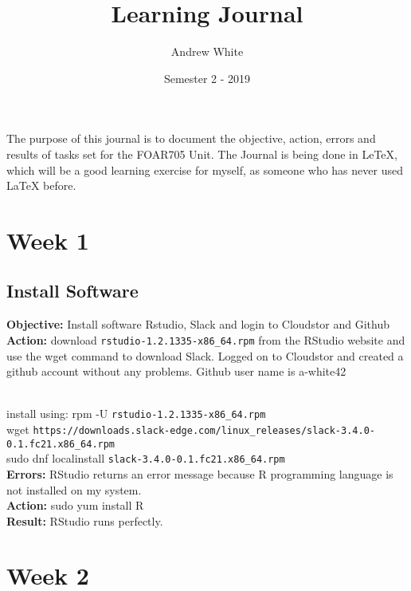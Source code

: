 \documentclass[a4paper,12pt]{article}
\title{Learning Journal}
\author{Andrew White}
\date{Semester 2 - 2019}
\begin{document}
\maketitle

\tableofcontents

\newpage

The purpose of this journal is to document the objective, action, errors and results of tasks set for the FOAR705 Unit. The Journal is being done in LeTeX, which will be a good learning exercise for myself, as someone who has never used LaTeX before. 

\section{Week 1}
\subsection{Install Software} 

\noindent \textbf{Objective:} Install software Rstudio, Slack and login to Cloudstor and Github \\

\noindent \textbf{Action:} download \verb|rstudio-1.2.1335-x86_64.rpm| from the RStudio website and use the wget command to download Slack. Logged on to Cloudstor and created a github account without any problems. Github user name is a-white42\\\

\noindent install using: rpm -U \verb|rstudio-1.2.1335-x86_64.rpm|\\

\noindent wget \verb|https://downloads.slack-edge.com/linux_releases/slack-3.4.0-0.1.fc21.x86_64.rpm|\\

\noindent sudo dnf localinstall \verb|slack-3.4.0-0.1.fc21.x86_64.rpm|\\

\noindent \textbf{Errors:} RStudio returns an error message because R programming language is not installed on my system.\\

\noindent \textbf{Action:} sudo yum install R\\

\noindent \textbf{Result:} RStudio runs perfectly. 

\section{Week 2}
\end{document}
